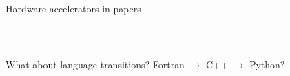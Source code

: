 \documentclass[aspectratio=169]{beamer}
\begin{document}
\begin{frame}{Hardware accelerators in  papers}
\begin{columns}
\end{columns}
\end{frame}

\begin{frame}{\mbox{ }}
\vspace{1 cm}
\begin{center}
\Large What about language transitions? Fortran $\to$ C++ $\to$ Python?
\end{center}
\end{frame}
\end{document}
